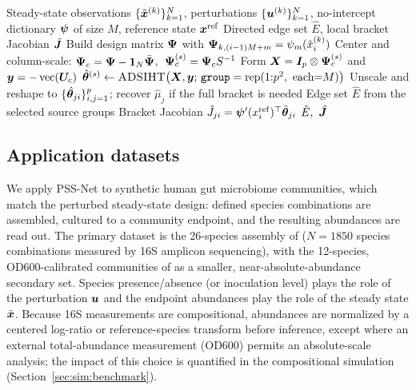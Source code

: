 \begin{algorithm}[t]
\caption{PSS-Net: directed network inference from perturbed steady states}
\label{alg:pssnet}
\begin{algorithmic}[1]
\Require Steady-state observations $\{\tilde{\bm{x}}^{(k)}\}_{k=1}^N$, perturbations
  $\{\bm{u}^{(k)}\}_{k=1}^N$, no-intercept dictionary $\bm{\psi}$ of size $M$,
  reference state $\bm{x}^{\mathrm{ref}}$
\Ensure Directed edge set $\hat E$, local bracket Jacobian $\hat{\bm{J}}$
\State Build design matrix $\bm{\Psi}$ with
  $\bm{\Psi}_{k,(i-1)M+m}=\psi_m(\tilde x_i^{(k)})$ 
\State Center and column-scale:
  $\bm{\Psi}_{c}=\bm{\Psi}-\mathbf 1_N\bar{\bm{\Psi}}$, $\;\bm{\Psi}_{c}^{(s)}=\bm{\Psi}_{c} S^{-1}$
\State Form $\bm{X}=\bm{I}_p\otimes\bm{\Psi}_{c}^{(s)}$ and $\bm{y}=-\operatorname{vec}(\bm{U}_{c})$
\State $\hat{\bm{\theta}}^{(s)}\gets\textsc{ADSIHT}{}\big(\bm{X},\bm{y};\,
  \texttt{group}=\mathrm{rep}(1{:}p^2,\ \text{each}{=}M)\big)$
\State Unscale and reshape to $\{\hat{\bm{\theta}}_{ji}\}_{i,j=1}^p$; recover
  $\hat\mu_j$ if the full bracket is needed 
\State Edge set $\hat E$ from the selected source groups 
\State Bracket Jacobian
  $\hat J_{ji}=\bm{\psi}'(x_i^{\mathrm{ref}})^\top\hat{\bm{\theta}}_{ji}$
\State \Return $\hat E,\ \hat{\bm{J}}$
\end{algorithmic}
\end{algorithm}

\subsection{Application datasets}
\label{sec:method:data}

We apply PSS-Net to synthetic human gut microbiome communities, which match the
perturbed steady-state design: defined species combinations are assembled,
cultured to a community endpoint, and the resulting abundances are read out.
The primary dataset is the 26-species assembly of \citet{clark2021design}
($N=1850$ species combinations measured by 16S amplicon sequencing), with the
12-species, OD600-calibrated communities of \citet{venturelli2018deciphering} as
a smaller, near-absolute-abundance secondary set.  Species presence/absence (or
inoculation level) plays the role of the perturbation $\bm{u}$ and the endpoint
abundances play the role of the steady state $\tilde{\bm{x}}$.  Because 16S
measurements are compositional, abundances are normalized by a centered
log-ratio or reference-species transform before inference, except where an
external total-abundance measurement (OD600) permits an absolute-scale analysis;
the impact of this choice is quantified in the compositional simulation
(Section~\ref{sec:sim:benchmark}).
